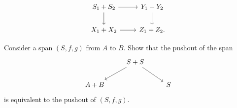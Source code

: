 \begin{exercises}
\begin{equation*}
\begin{tikzcd}
S_1+S_2 \arrow[r] \arrow[d] & Y_1+ Y_2 \arrow[d] \\
X_1 +X_2 \arrow[r] & Z_1+Z_2. 
\end{tikzcd}
\end{equation*}
\item Consider a span $(S,f,g)$ from $A$ to $B$. Show that the pushout of the span
\begin{equation*}
\begin{tikzcd}
& S+S \arrow[dl] \arrow[dr] \\
A + B & & S
\end{tikzcd}
\end{equation*}
is equivalent to the pushout of $(S,f,g)$.
\end{exercises}
